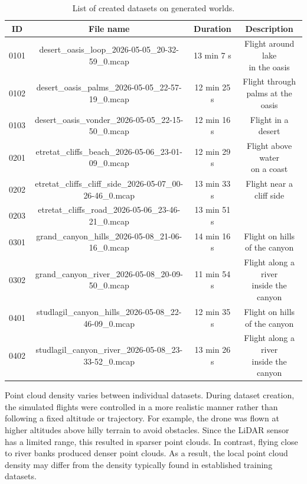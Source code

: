 \begin{table}[!h]
	\centering
	\small
	\noindent
	\begin{tabular}{c|c|c|c}
		ID & File name & Duration & Description \\
		\hline
		0101 & desert\_oasis\_loop\_2026-05-05\_20-32-59\_0.mcap & 13 min 7 s & \makecell{Flight around lake \\ in the oasis} \\
		0102 & desert\_oasis\_palms\_2026-05-05\_22-57-19\_0.mcap & 12 min 25 s & \makecell{Flight through \\ palms at the oasis} \\
		0103 & desert\_oasis\_vonder\_2026-05-05\_22-15-50\_0.mcap & 12 min 16 s & Flight in a desert \\
		0201 & etretat\_cliffs\_beach\_2026-05-06\_23-01-09\_0.mcap & 12 min 29 s & \makecell{Flight above water \\ on a coast} \\ 
		0202 & etretat\_cliffs\_cliff\_side\_2026-05-07\_00-26-46\_0.mcap & 13 min 33 s & \makecell{Flight near a \\ cliff side} \\ 
		0203 & etretat\_cliffs\_road\_2026-05-06\_23-46-21\_0.mcap & 13 min 51 s & \makecell{Flight along a road} \\ 
		0301 & grand\_canyon\_hills\_2026-05-08\_21-06-16\_0.mcap & 14 min 16 s & \makecell{Flight on hills \\ of the canyon} \\ 
		0302 & grand\_canyon\_river\_2026-05-08\_20-09-50\_0.mcap & 11 min 54 s & \makecell{Flight along a river \\ inside the canyon} \\ 
		0401 & studlagil\_canyon\_hills\_2026-05-08\_22-46-09\_0.mcap & 12 min 35 s & \makecell{Flight on hills \\ of the canyon} \\ 
 		0402 & studlagil\_canyon\_river\_2026-05-08\_23-33-52\_0.mcap & 13 min 26 s & \makecell{Flight along a river \\ inside the canyon} \\ 
	\end{tabular}
	\noindent
	\caption{List of created datasets on generated worlds.}
	\label{tab:generated_datasets}
\end{table}

Point cloud density varies between individual datasets. During dataset creation, the simulated flights were controlled in a more realistic manner rather than following a fixed altitude or trajectory. For example, the drone was flown at higher altitudes above hilly terrain to avoid obstacles. Since the \ac{LiDAR} sensor has a limited range, this resulted in sparser point clouds. In contrast, flying close to river banks produced denser point clouds. As a result, the local point cloud density may differ from the density typically found in established training datasets.

